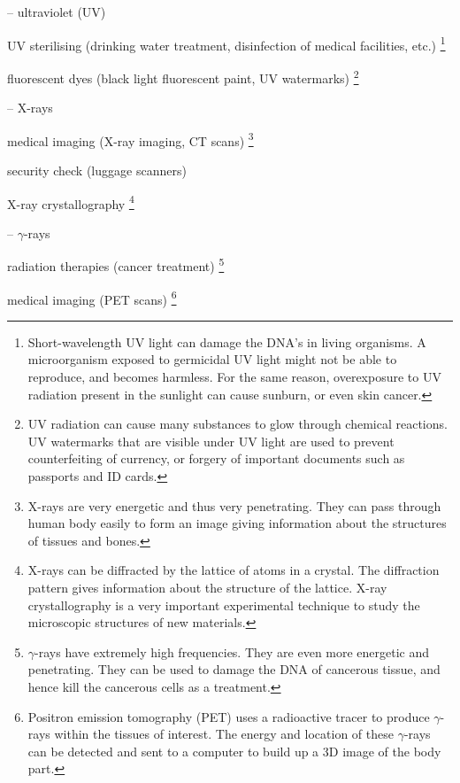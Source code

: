 \begin{compactitem}
	\item[--] ultraviolet (UV)
	
	\xskip UV sterilising (drinking water treatment, disinfection of medical facilities, etc.)
	\footnote{Short-wavelength UV light can damage the DNA's in living organisms. A microorganism exposed to germicidal UV light might not be able to reproduce, and becomes harmless. For the same reason, overexposure to UV radiation present in the sunlight can cause sunburn, or even skin cancer.}
		
	\xskip fluorescent dyes (black light fluorescent paint, UV watermarks)
	\footnote{UV radiation can cause many substances to glow through chemical reactions. UV watermarks that are visible under UV light are used to prevent counterfeiting of currency, or forgery of important documents such as passports and ID cards.}
	
	\item[--] X-rays
	
	\xskip medical imaging (X-ray imaging, CT scans)
	\footnote{X-rays are very energetic and thus very penetrating. They can pass through human body easily to form an image giving information about the structures of tissues and bones.}
	
	\xskip security check (luggage scanners)
	
	\xskip X-ray crystallography
	\footnote{X-rays can be diffracted by the lattice of atoms in a crystal. The diffraction pattern gives information about the structure of the lattice. X-ray crystallography is a very important experimental technique to study the microscopic structures of new materials.}
	
	\item[--] $\gamma$-rays
	
	\xskip radiation therapies (cancer treatment)
	\footnote{$\gamma$-rays have extremely high frequencies. They are even more energetic and penetrating. They can be used to damage the DNA of cancerous tissue, and hence kill the cancerous cells as a treatment.}
	
	\xskip medical imaging (PET scans)
	\footnote{Positron emission tomography (PET) uses a radioactive tracer to produce $\gamma$-rays within the tissues of interest. The energy and location of these $\gamma$-rays can be detected and sent to a computer to build up a 3D image of the body part.}
\end{compactitem}


